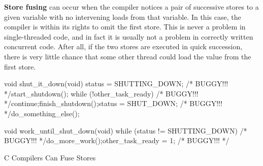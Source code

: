 {\bf Store fusing} can occur when the compiler notices a pair of successive
stores to a given variable with no intervening loads from that variable.
In this case, the compiler is within its rights to omit the first store.
This is never a problem in single-threaded code, and in fact it is
usually not a problem in correctly written concurrent code.
After all, if the two stores are executed in quick succession, there is
very little chance that some other thread could load the value from the
first store.

\begin{listing}
\begin{fcvlabel}
\begin{VerbatimL}[commandchars=\\\[\]]
void shut_it_down(void)
{
	status = SHUTTING_DOWN; /* BUGGY!!! */\lnlbl[store:a]
	start_shutdown();
	while (!other_task_ready) /* BUGGY!!! */\lnlbl[loop:b]
		continue;\lnlbl[loop:e]
	finish_shutdown();\lnlbl[finish]
	status = SHUT_DOWN; /* BUGGY!!! */\lnlbl[store:b]
	do_something_else();
}

void work_until_shut_down(void)
{
	while (status != SHUTTING_DOWN) /* BUGGY!!! */
		do_more_work();
	other_task_ready = 1; /* BUGGY!!! */
}
\end{VerbatimL}
\end{fcvlabel}
\caption{C Compilers Can Fuse Stores}
\label{lst:toolsoftrade:C Compilers Can Fuse Stores}
\end{listing}

